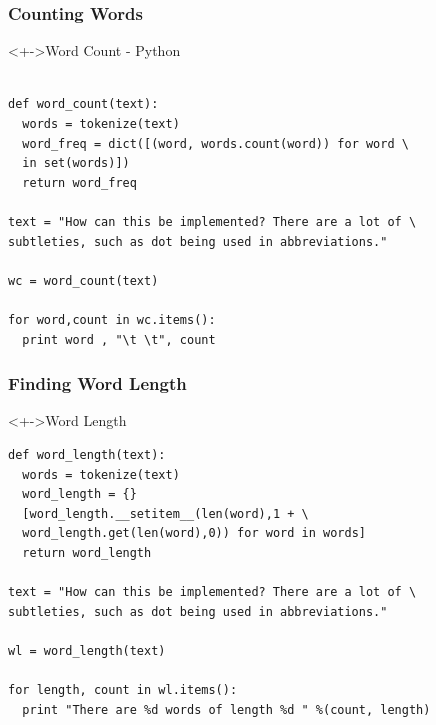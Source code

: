 \documentclass[serif,11pt,aspectratio=1610,table]{beamer}
\begin{document}
\begin{frame}[fragile]
 \frametitle{Counting Words}
\footnotesize
\begin{block}<+->{Word Count - Python}
 \begin{verbatim}

def word_count(text):
  words = tokenize(text)
  word_freq = dict([(word, words.count(word)) for word \
  in set(words)])
  return word_freq

text = "How can this be implemented? There are a lot of \
subtleties, such as dot being used in abbreviations."

wc = word_count(text)

for word,count in wc.items():
  print word , "\t \t", count
 \end{verbatim}

\end{block}

\end{frame}

\begin{frame}[fragile]
 \frametitle{Finding Word Length}
\begin{block}<+->{Word Length}
 \footnotesize
\begin{verbatim}
def word_length(text):
  words = tokenize(text)
  word_length = {}
  [word_length.__setitem__(len(word),1 + \
  word_length.get(len(word),0)) for word in words]
  return word_length

text = "How can this be implemented? There are a lot of \
subtleties, such as dot being used in abbreviations."

wl = word_length(text)

for length, count in wl.items():
  print "There are %d words of length %d " %(count, length)
\end{verbatim}

\end{block}

\end{frame}
\end{document}
